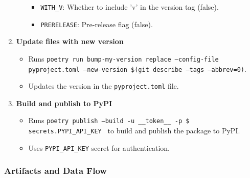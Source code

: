 \begin{enumerate}
\begin{itemize}
\begin{itemize}
            \item \texttt{WITH\_V}: Whether to include 'v' in the version tag (false).
            \item \texttt{PRERELEASE}: Pre-release flag (false).
        \end{itemize}
    \end{itemize}
    \item \textbf{Update files with new version}
    \begin{itemize}
        \item Runs \texttt{poetry run bump-my-version replace --config-file pyproject.toml --new-version \$(git describe --tags --abbrev=0)}.
        \item Updates the version in the \texttt{pyproject.toml} file.
    \end{itemize}
    \item \textbf{Build and publish to PyPI}
    \begin{itemize}
        \item Runs \texttt{poetry publish --build -u \_\_token\_\_ -p \${{ secrets.PYPI\_API\_KEY }}} to build and publish the package to PyPI.
        \item Uses \texttt{PYPI\_API\_KEY} secret for authentication.
    \end{itemize}
\end{enumerate}


\subsubsection{Artifacts and Data Flow}

